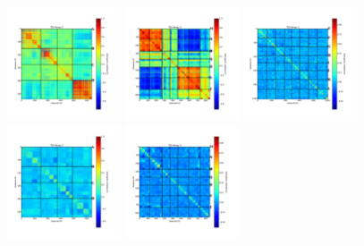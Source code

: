 \begin{figure}[ht!]
\begin{center}
\includegraphics[width=0.3\textwidth]{Figures/NoiseTests/corrmat_TOI_CM_array_2_20170228s151.pdf}
\includegraphics[width=0.3\textwidth]{Figures/NoiseTests/corrmat_TOI_CM_array_3_20170228s151.pdf}
\includegraphics[width=0.3\textwidth]{Figures/NoiseTests/corrmat_TOI_PCA_array_1_20170228s151.pdf}
\includegraphics[width=0.3\textwidth]{Figures/NoiseTests/corrmat_TOI_PCA_array_2_20170228s151.pdf}
\includegraphics[width=0.3\textwidth]{Figures/NoiseTests/corrmat_TOI_PCA_array_3_20170228s151.pdf}

\end{center}
\end{figure}
